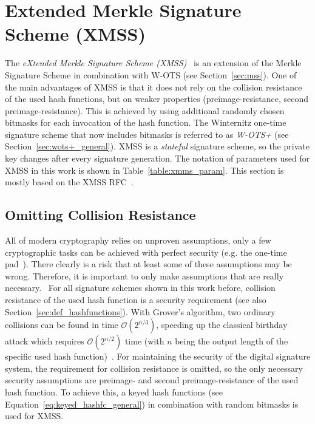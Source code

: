 \section{Extended Merkle Signature Scheme (XMSS)}
\label{sec:xmss}
The \textit{eXtended Merkle Signature Scheme (XMSS)}~\cite{xmss_RFC8391} is an extension of the Merkle Signature Scheme in combination with W-OTS (see Section~\ref{sec:mss}). One of the main advantages of XMSS is that it does not rely on the collision resistance of the used hash functions, but on weaker properties (preimage-resistance, second preimage-resistance). This is achieved by using additional randomly chosen bitmasks for each invocation of the hash function.
The Winternitz one-time signature scheme that now includes bitmasks is referred to as \textit{W-OTS+} (see Section~\ref{sec:wots+_general}). XMSS is a \textit{stateful} signature scheme, so the private key changes after every signature generation. The notation of parameters used for XMSS in this work is shown in Table~\ref{table:xmms_param}. This section is mostly based on the XMSS RFC~\cite{xmss_RFC8391}.

\subsection{Omitting Collision Resistance}
\label{sec:omit_coll_res}
All of modern cryptography relies on unproven assumptions, only a few cryptographic tasks can be achieved with perfect security (e.g. the one-time pad~\cite{one_time_pad_2013}). There clearly is a risk that at least some of these assumptions may be wrong. Therefore, it is important to only make assumptions that are really necessary.~\cite{minimal_security_assump_phd_2016}
For all signature schemes shown in this work before, collision resistance of the used hash function is a security requirement (see also Section~\ref{sec:def_hashfunctions}). 
With Grover’s algorithm, two ordinary collisions can be found in time $\mathcal{O}(2^{n/3})$, speeding up the classical birthday attack which requires $\mathcal{O}(2^{n/2})$ time (with $n$ being the output length of the specific used hash function)~\cite{colission_complexity_reduction_quantum_2019, birthday_attack_quantum_collision_1998}. %
For maintaining the security of the digital signature system, the requirement for collision resistance is omitted, so the only necessary security assumptions are preimage- and second preimage-resistance of the used hash function.
To achieve this, a keyed hash functions (see Equation~\ref{eq:keyed_hashfc_general}) in combination with random bitmasks is used for XMSS. %


